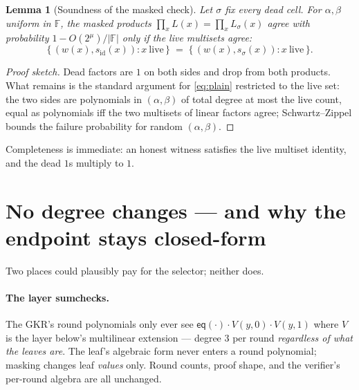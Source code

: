 \documentclass[11pt]{article}
\newcommand{\F}{\mathbb{F}}
\newcommand{\eq}{\mathsf{eq}}
\newcommand{\sid}{s_{\mathrm{id}}}
\newcommand{\ssig}{s_{\sigma}}
\newtheorem{lemma}{Lemma}
\theoremstyle{definition}
\begin{document}
\begin{lemma}[Soundness of the masked check]
Let $\sigma$ fix every dead cell. For $\alpha, \beta$ uniform in $\F$,
the masked products
$\prod_x L(x) = \prod_x L_\sigma(x)$ agree with probability
$1 - O(2^{\mu})/|\F|$ only if the live multisets agree:
\[
\bigl\{\, (w(x), \sid(x)) : x \ \mathrm{live} \,\bigr\}
\;=\;
\bigl\{\, (w(x), \ssig(x)) : x \ \mathrm{live} \,\bigr\}.
\]
\end{lemma}

\begin{proof}[Proof sketch]
Dead factors are $1$ on both sides and drop from both products. What
remains is the standard argument for \eqref{eq:plain} restricted to the
live set: the two sides are polynomials in $(\alpha, \beta)$ of total
degree at most the live count, equal as polynomials iff the two multisets
of linear factors agree; Schwartz--Zippel bounds the failure probability
for random $(\alpha, \beta)$.
\end{proof}

Completeness is immediate: an honest witness satisfies the live multiset
identity, and the dead $1$s multiply to $1$.

\section{No degree changes --- and why the endpoint stays closed-form}

Two places could plausibly pay for the selector; neither does.

\paragraph{The layer sumchecks.} The GKR's round polynomials only ever
see $\eq(\cdot)\cdot V(y,0)\cdot V(y,1)$ where $V$ is the layer below's
multilinear extension --- degree $3$ per round \emph{regardless of what
the leaves are}. The leaf's algebraic form never enters a round
polynomial; masking changes leaf \emph{values} only. Round counts, proof
shape, and the verifier's per-round algebra are all unchanged.
\end{document}
